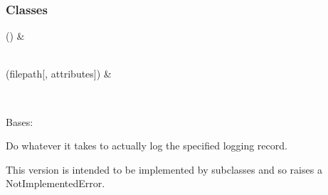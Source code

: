 \documentclass[letterpaper,10pt,english]{sphinxmanual}
\begin{document}
\subsubsection*{Classes}


\begin{savenotes}\sphinxattablestart
\sphinxthistablewithglobalstyle
\sphinxthistablewithnovlinesstyle
\centering
\begin{tabulary}{\linewidth}[t]{}
\sphinxtoprule
\sphinxtableatstartofbodyhook
\sphinxAtStartPar
{\hyperref[\detokenize{_autosummary/HDF5_BLS.load_formats.load_dat:HDF5_BLS.load_formats.load_dat.PipelineLogger}]{}}()
&
\sphinxAtStartPar

\\
\sphinxhline
\sphinxAtStartPar
{\hyperref[\detokenize{_autosummary/HDF5_BLS.load_formats.load_dat:HDF5_BLS.load_formats.load_dat.TimeDomain}]{}}(filepath{[}, attributes{]})
&
\sphinxAtStartPar

\\
\sphinxbottomrule
\end{tabulary}
\sphinxtableafterendhook\par
\sphinxattableend\end{savenotes}

\begin{fulllineitems}
\label{\detokenize{_autosummary/HDF5_BLS.load_formats.load_dat:HDF5_BLS.load_formats.load_dat.PipelineLogger}}
\pysigstartsignatures
\pysigline
{}
\pysigstopsignatures
\sphinxAtStartPar
Bases: 

\begin{fulllineitems}
\label{\detokenize{_autosummary/HDF5_BLS.load_formats.load_dat:HDF5_BLS.load_formats.load_dat.PipelineLogger.emit}}
\pysigstartsignatures
\pysiglinewithargsret
{}
{}
{}
\pysigstopsignatures
\sphinxAtStartPar
Do whatever it takes to actually log the specified logging record.

\sphinxAtStartPar
This version is intended to be implemented by subclasses and so
raises a NotImplementedError.

\end{fulllineitems}


\end{fulllineitems}
\end{document}
